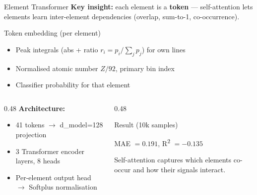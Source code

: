 \begin{frame}{Element Transformer}
    \textbf{Key insight:} each element is a \textbf{token} — self-attention lets elements learn inter-element dependencies (overlap, sum-to-1, co-occurrence).

    \vspace{0.1cm}
    \begin{block}{Token embedding (per element)}
        \begin{itemize}
            \item Peak integrals (abs + ratio $r_i = p_i/\sum_j p_j$) for own lines
            \item Normalised atomic number $Z/92$, primary bin index
            \item Classifier probability for that element
        \end{itemize}
    \end{block}

    \vspace{0.1cm}
    \begin{columns}
        \begin{column}{0.48\textwidth}
            \textbf{Architecture:}
            \begin{itemize}
                \item 41 tokens $\rightarrow$ d\_model=128 projection
                \item 3 Transformer encoder layers, 8 heads
                \item Per-element output head $\rightarrow$ Softplus normalisation
            \end{itemize}
        \end{column}
        \begin{column}{0.48\textwidth}
            \begin{block}{Result (10k samples)}
                \begin{center}
                    MAE $= 0.191$, R\textsuperscript{2} $= -0.135$
                \end{center}
                \small Self-attention captures which elements co-occur and how their signals interact.
            \end{block}
        \end{column}
    \end{columns}
\end{frame}

